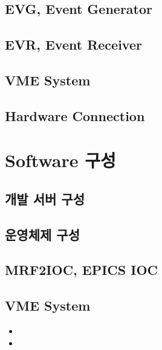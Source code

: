 \documentclass[11pt
  , a4paper
  , article
  , oneside
]{memoir}
\begin{document}
\clearpage

\section{EVG, Event Generator}

\section{EVR, Event Receiver}

\section{VME System}

\section{Hardware Connection}

\clearpage

\chapter{Software 구성}
\section{개발 서버 구성}
\section{운영체제 구성}

\section{MRF2IOC, EPICS IOC}

\section{VME System}


\begin{itemize}
	\item 
	\item 
\end{itemize}



\clearpage


\end{document}
